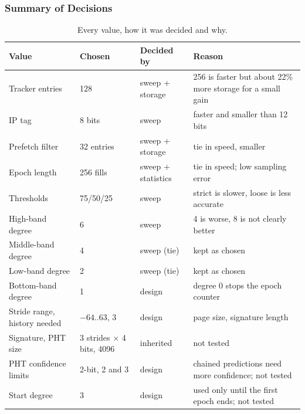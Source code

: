 \subsubsection{Summary of Decisions}
\begin{table}[H]\centering\small
\begin{tabularx}{\textwidth}{@{}lllX@{}}
\toprule
Value & Chosen & Decided by & Reason \\
\midrule
Tracker entries              & 128                       & sweep + storage    & 256 is faster but about 22\% more storage for a small gain \\
IP tag                       & 8 bits                    & sweep              & faster and smaller than 12 bits \\
Prefetch filter              & 32 entries                & sweep + storage    & tie in speed, smaller \\
Epoch length                 & 256 fills                 & sweep + statistics & tie in speed; low sampling error \\
Thresholds                   & 75/50/25                  & sweep              & strict is slower, loose is less accurate \\
High-band degree             & 6                         & sweep              & 4 is worse, 8 is not clearly better \\
Middle-band degree           & 4                         & sweep (tie)        & kept as chosen \\
Low-band degree              & 2                         & sweep (tie)        & kept as chosen \\
Bottom-band degree           & 1                         & design             & degree 0 stops the epoch counter \\
Stride range, history needed & $-64..63$, 3              & design             & page size, signature length \\
Signature, PHT size          & 3 strides $\times$ 4 bits, 4096 & inherited    & not tested \\
PHT confidence limits        & 2-bit, 2 and 3            & design             & chained predictions need more confidence; not tested \\
Start degree                 & 3                         & design             & used only until the first epoch ends; not tested \\
\bottomrule
\end{tabularx}
\caption{Every value, how it was decided and why.}
\end{table}

